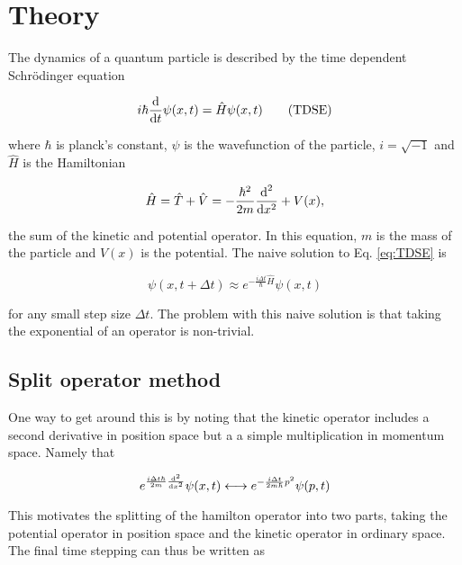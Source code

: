 \newpage
\section{Theory}
\label{sec:Theory}

The dynamics of a quantum particle is described by the time dependent Schrödinger equation

\begin{equation}
  \label{eq:TDSE}
  i \hbar \frac{\textnormal{d}}{\textnormal{d} t}\psi(x,t) = \hat{H}\psi(x,t) \tag{TDSE}
\end{equation}

where $\hbar$ is planck's constant, $\psi$ is the wavefunction of the particle, $i = \sqrt{-1}$ and $\hat{H}$ is the Hamiltonian

\begin{equation}
  \label{eq:ham}
  \hat{H} = \hat{T} + \hat{V} = - \frac{\hbar^2}{2m}\frac{\textnormal{d}^2}{\textnormal{d} x^2} + V(x),
\end{equation}

the sum of the kinetic and potential operator. In this equation, $m$ is the mass of the particle and $V(x)$ is the potential. The naive solution to Eq. \eqref{eq:TDSE} is

\begin{equation}
  \label{eq:TDSEsol}
  \psi(x,t+\Delta t) \approx e^{-\frac{i\Delta t}{\hbar}\hat{H}} \psi(x,t)
\end{equation}

for any small step size $\Delta t$. The problem with this naive solution is that taking the exponential of an operator is non-trivial.

\subsection{Split operator method}
\label{sec:splitOp}

One way to get around this is by noting that the kinetic operator includes a second derivative in position space but a a simple multiplication in momentum space. Namely that

\begin{equation*}
  e^{\frac{i \Delta t \hbar}{2m}\frac{\textnormal{d}^2}{\textnormal{d} x^2}}\psi(x,t) \longleftrightarrow e^{- \frac{i \Delta t }{2m\hbar}p^2}\psi(p,t)
\end{equation*}

This motivates the splitting of the hamilton operator into two parts, taking the potential operator in position space and the kinetic operator in ordinary space. The final time stepping can thus be written as

